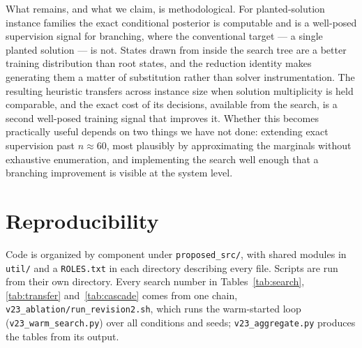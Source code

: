 \documentclass[preprint,12pt]{elsarticle}
\begin{document}
What remains, and what we claim, is methodological. For planted-solution instance families the exact conditional posterior is computable and is a well-posed supervision signal for branching, where the conventional target --- a single planted solution --- is not. States drawn from inside the search tree are a better training distribution than root states, and the reduction identity makes generating them a matter of substitution rather than solver instrumentation. The resulting heuristic transfers across instance size when solution multiplicity is held comparable, and the exact cost of its decisions, available from the search, is a second well-posed training signal that improves it. Whether this becomes practically useful depends on two things we have not done: extending exact supervision past $n\approx60$, most plausibly by approximating the marginals without exhaustive enumeration, and implementing the search well enough that a branching improvement is visible at the system level.

\section*{Reproducibility}

Code is organized by component under \texttt{proposed\_src/}, with shared modules in \texttt{util/} and a \texttt{ROLES.txt} in each directory describing every file. Scripts are run from their own directory. Every search number in Tables~\ref{tab:search}, \ref{tab:transfer} and~\ref{tab:cascade} comes from one chain, \texttt{v23\_ablation/run\_revision2.sh}, which runs the warm-started loop (\texttt{v23\_warm\_search.py}) over all conditions and seeds; \texttt{v23\_aggregate.py} produces the tables from its output.
\end{document}
